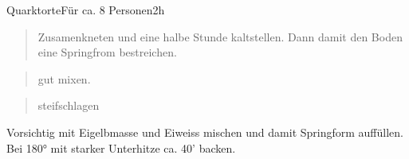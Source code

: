 \documentclass[
  a4paper,
]{article}
\begin{document}
\begin{recipe}{Quarktorte}{Für ca. 8 Personen}{2h}


\begin{quote}
Zusamenkneten und eine halbe Stunde kaltstellen. Dann damit den Boden
eine Springfrom bestreichen.
\end{quote}

\freeform\hrulefill


\begin{quote}
gut mixen.
\end{quote}

\freeform\hrulefill


\begin{quote}
steifschlagen
\end{quote}

\freeform\hrulefill


Vorsichtig mit Eigelbmasse und Eiweiss mischen und damit Springform
auffüllen. Bei 180° mit starker Unterhitze ca. 40' backen.

\freeform\hrulefill\newline\freeform{}\end{recipe}
\end{document}
